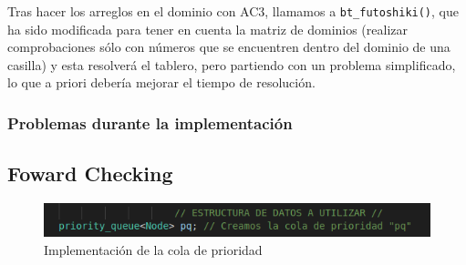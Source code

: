\documentclass[12pt]{article}
\begin{document}
Tras hacer los arreglos en el dominio con AC3, llamamos a  \verb|bt_futoshiki()|, que ha sido
 modificada para tener en cuenta la matriz de dominios (realizar comprobaciones sólo con números que 
 se encuentren dentro del dominio de una casilla) y esta resolverá el tablero, pero partiendo con un problema simplificado, lo que
 a priori debería mejorar el tiempo de resolución.

\verb||
\textbf{}
\textit{}

\subsubsection{Problemas durante la implementación}
\subsection{Foward Checking}
\begin{figure}[h]
    \centering
    \includegraphics[scale=0.5]{cola_de_prior.png}
    \caption{Implementación de la cola de prioridad}
    \label{fig:colprior}
\end{figure}

\section{}
\end{document}
